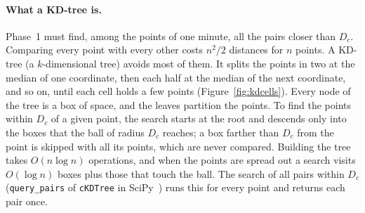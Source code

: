 \paragraph{What a KD-tree is.} Phase~1 must find, among the points of one minute, all the pairs
closer than $D_c$. Comparing every point with every other costs $n^2/2$ distances for $n$
points. A KD-tree (a $k$-dimensional tree) avoids most of them. It splits the points in two at
the median of one coordinate, then each half at the median of the next coordinate, and so on,
until each cell holds a few points (Figure~\ref{fig:kdcells}). Every node of the tree is a box of
space, and the leaves partition the points. To find the points within $D_c$ of a given point,
the search starts at the root and descends only into the boxes that the ball of radius $D_c$
reaches; a box farther than $D_c$ from the point is skipped with all its points, which are never
compared. Building the tree takes $O(n\log n)$ operations, and when the points are spread out a
search visits $O(\log n)$ boxes plus those that touch the ball. The search of all pairs within
$D_c$ (\texttt{query\_pairs} of \texttt{cKDTree} in SciPy~\cite{virtanen2020}) runs this for every
point and returns each pair once.

